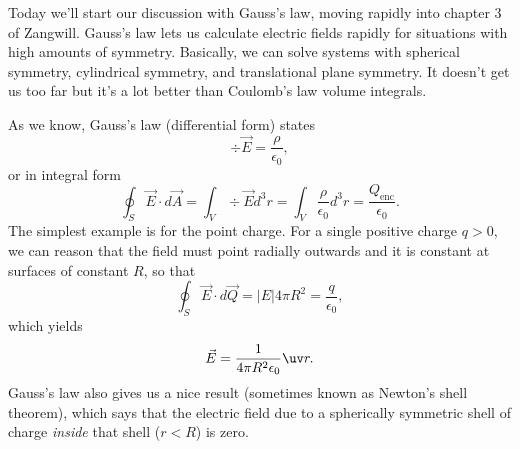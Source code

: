 Today we'll start our discussion with Gauss's law, moving rapidly into chapter 3 of Zangwill. Gauss's law lets us calculate electric fields rapidly for situations with high amounts of symmetry. Basically, we can solve systems with spherical symmetry, cylindrical symmetry, and translational plane symmetry. It doesn't get us too far but it's a lot better than Coulomb's law volume integrals.

As we know, Gauss's law (differential form) states
\begin{equation}
    \div \vec E = \frac{\rho}{\epsilon_0},
\end{equation}
or in integral form
\begin{equation}
    \oint_S \vec E \cdot d\vec A = \int_V \div \vec E d^3 r = \int_V \frac{\rho}{\epsilon_0} d^3 r = \frac{Q_\text{enc}}{\epsilon_0}.
\end{equation}
The simplest example is for the point charge. For a single positive charge $q>0$, we can reason that the field must point radially outwards and it is constant at surfaces of constant $R$, so that
\begin{equation}
    \oint_S \vec E \cdot d\vec Q = |E| 4\pi R^2 = \frac{q}{\epsilon_0},
\end{equation}
which yields
\begin{equation}
    \vec{E} = \frac{1}{4\pi R^2 \epsilon_0} \uv r.
\end{equation}
Gauss's law also gives us a nice result (sometimes known as Newton's shell theorem), which says that the electric field due to a spherically symmetric shell of charge \emph{inside} that shell ($r<R$) is zero.

